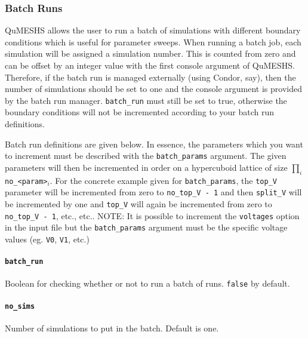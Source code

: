 \documentclass[12pt]{article}
\begin{document}
\subsubsection{Batch Runs}
\label{subsubsec:BatchRuns}

QuMESHS allows the user to run a batch of simulations with different boundary
conditions which is useful for parameter sweeps.  When running a batch job, each
simulation will be assigned a simulation number.  This is counted from zero and can be
offset by an integer value with the first console argument of QuMESHS.  Therefore,
if the batch run is managed externally (using Condor, say), then the number of simulations
should be set to one and the console argument is provided by the batch run manager.
\texttt{batch\_run} must still be set to true, otherwise the boundary conditions will
not be incremented according to your batch run definitions.

Batch run definitions are given below.  In essence, the parameters which you want
to increment must be described with the \texttt{batch\_params} argument.  The given
parameters will then be incremented in order on a hypercuboid lattice of size
$\prod_i$ \texttt{no\_<param>}$_i$.  For the concrete example given for
\texttt{batch\_params}, the \texttt{top\_V} parameter will be incremented from
zero to \texttt{no\_top\_V - 1} and then \texttt{split\_V} will be incremented by
one and \texttt{top\_V} will again be incremented from zero to \texttt{no\_top\_V
- 1}, etc., etc..  {\color{red} NOTE:} It is possible to increment the \texttt{voltages}
option in the input file but the \texttt{batch\_params} argument must be the
specific voltage values (eg. \texttt{V0}, \texttt{V1}, etc.)

\paragraph{\texttt{batch\_run}}
Boolean for checking whether or not to run a batch of runs.  \texttt{false} by default.

\paragraph{\texttt{no\_sims}}
Number of simulations to put in the batch.  Default is one.
\end{document}
